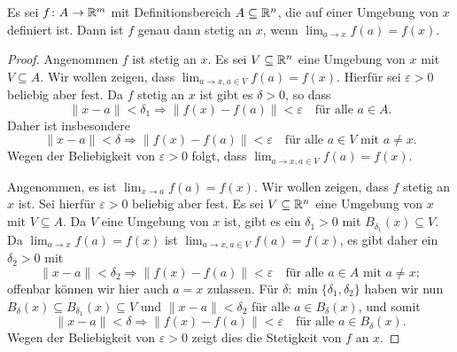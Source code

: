 \documentclass[a4paper,10pt]{article}
\begin{document}
\begin{prop}
 Es sei $f \colon A \to \mathbb{R}^m$ mit Definitionsbereich $A \subseteq \mathbb{R}^n$, die auf einer Umgebung von $x$ definiert ist. Dann ist $f$ genau dann stetig an $x$, wenn $\lim_{a \to x} f(a) = f(x)$.
\end{prop}
\begin{proof}
 Angenommen $f$ ist stetig an $x$. Es sei $V \subseteq \mathbb{R}^n$ eine Umgebung von $x$ mit $V \subseteq A$. Wir wollen zeigen, dass $\lim_{a \to x, a \in V} f(a) = f(x)$. Hierfür sei $\varepsilon > 0$ beliebig aber fest. Da $f$ stetig an $x$ ist gibt es $\delta > 0$, so dass
 \[
  \|x-a\| < \delta_1 \Rightarrow \|f(x)-f(a)\| < \varepsilon
  \quad \text{für alle $a \in A$}.
 \]
 Daher ist insbesondere
 \[
  \|x-a\| < \delta \Rightarrow \|f(x)-f(a)\| < \varepsilon
  \quad \text{für alle $a \in V$ mit $a \neq x$}.
 \]
 Wegen der Beliebigkeit von $\varepsilon > 0$ folgt, dass $\lim_{a \to x, a \in V} f(a) = f(x)$.
 
 Angenommen, es ist $\lim_{x \to a} f(a) = f(x)$. Wir wollen zeigen, dass $f$ stetig an $x$ ist. Sei hierfür $\varepsilon > 0$ beliebig aber fest. Es sei $V \subseteq \mathbb{R}^n$ eine Umgebung von $x$ mit $V \subseteq A$. Da $V$ eine Umgebung von $x$ ist, gibt es ein $\delta_1 > 0$ mit $B_{\delta_1}(x) \subseteq V$. Da $\lim_{a \to x} f(a) = f(x)$ ist $\lim_{a \to x, a \in V} f(a) = f(x)$, es gibt daher ein $\delta_2 > 0$ mit
 \[
  \|x-a\| < \delta_2 \Rightarrow \|f(x)-f(a)\| < \varepsilon
  \quad \text{für alle $a \in A$ mit $a \neq x$};
 \]
 offenbar können wir hier auch $a = x$ zulassen. Für $\delta \colon \min\{\delta_1, \delta_2\}$ haben wir nun $B_\delta(x) \subseteq B_{\delta_1}(x) \subseteq V$ und $\|x-a\| < \delta_2$ für alle $a \in B_\delta(x)$, und somit
 \[
  \|x-a\| < \delta \Rightarrow \|f(x)-f(a)\| < \varepsilon
  \quad \text{für alle $a \in B_\delta(x)$.}
 \]
 Wegen der Beliebigkeit von $\varepsilon > 0$ zeigt dies die Stetigkeit von $f$ an $x$.
\end{proof}
\end{document}
